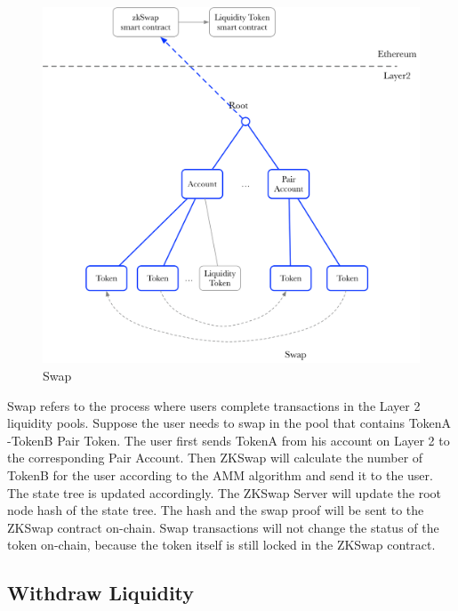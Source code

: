 \documentclass[]{template/llncs}
\begin{document}
\begin{figure}[htbp]
\centering
\includegraphics[width=0.9\columnwidth]{figure/swap}
\caption{Swap}
\label{fig:swap}
\end{figure}

Swap refers to the process where users complete transactions in the Layer 2 liquidity pools. Suppose the user needs to swap in the pool that contains TokenA -TokenB Pair Token. The user first sends TokenA from his account on Layer 2 to the corresponding Pair Account. Then ZKSwap will calculate the number of TokenB for the user according to the AMM algorithm and send it to the user. The state tree is updated accordingly. The ZKSwap Server will update the root node hash of the state tree. The hash and the swap proof will be sent to the ZKSwap contract on-chain. Swap transactions will not change the status of the token on-chain, because the token itself is still locked in the ZKSwap contract.


\subsection{Withdraw Liquidity}
\end{document}
